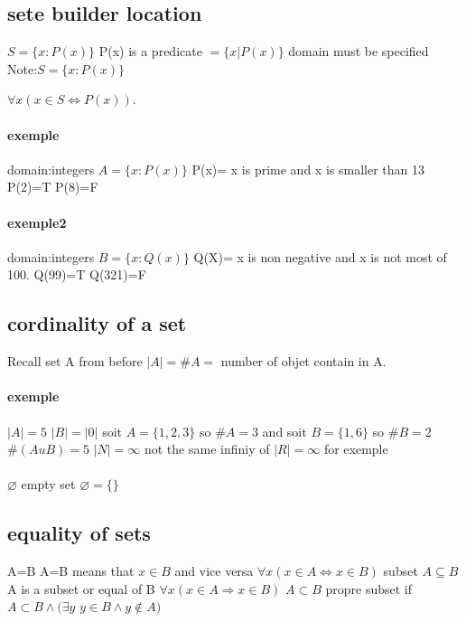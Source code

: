 \documentclass[a4paper,10pt]{article}
\begin{document}
\subsection{sete builder location}
$S=\{x:P(x)\}$ P(x) is a predicate $=\{x|P(x)\}$
\newline
domain must be specified
\newline
Note:$S=\{x:P(x)\}$ {$\forall x(x\in S\Leftrightarrow P(x))$.
\paragraph{exemple}
domain:integers
\newline
$A=\{x:P(x)\}$ P(x)= x is prime and x is smaller than 13
\newline
P(2)=T
\newline
P(8)=F
\paragraph{exemple2}
domain:integers
\newline
$B=\{x:Q(x)\}$ Q(X)= x is non negative and x is not most of 100.
\newline
Q(99)=T
\newline
Q(321)=F
\subsection{cordinality of a set}
Recall set A from before
\newline
$|A|=\#A=$ number of objet contain in A.
\paragraph{exemple}
$|A|=5$ $|B|=|0|$
\newline
soit $A=\{1,2,3\}$ so $\#A=3$ and soit $B=\{1,6\}$ so $\#B=2$ $\#(AuB)=5$
\newline
$|N|=\infty$ not the same infiniy of $|R|=\infty$ for exemple
\paragraph{}
$\varnothing$ empty set $\varnothing=\{\}$
\subsection{equality of sets}
A=B
\newline
A=B means that $x\in B$ and vice versa $\forall x(x\in A\Leftrightarrow x\in B)$
\newline
subset
\newline
$A\subseteq B$ A is a subset or equal of B $\forall x(x\in A\Rightarrow x\in B)$
\newline
$A\subset B$ propre subset
\newline
if $A\subset B\wedge (\exists y$ $y\in B\wedge y \notin A)$
}
\end{document}
